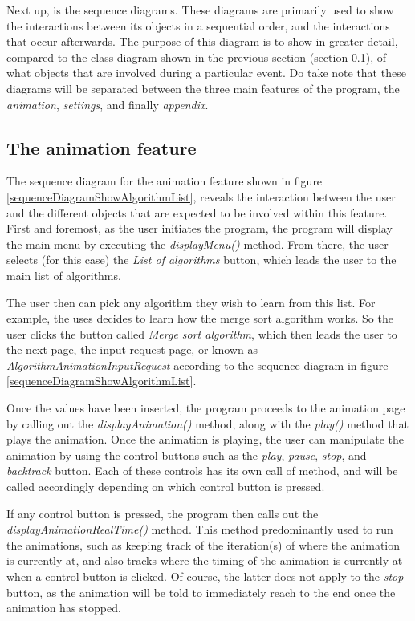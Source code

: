 Next up, is the sequence diagrams. These diagrams are primarily used to show the interactions between its objects in a sequential order, and the interactions that occur afterwards. The purpose of this diagram is to show in greater detail, compared to the class diagram shown in the previous section (section \ref{}), of what objects that are involved during a particular event. Do take note that these diagrams will be separated between the three main features of the program, the \textit{animation}, \textit{settings}, and finally \textit{appendix}.


\subsection{The animation feature}
The sequence diagram for the animation feature shown in figure \ref{sequenceDiagramShowAlgorithmList}, reveals the interaction between the user and the different objects that are expected to be involved within this feature. First and foremost, as the user initiates the program, the program will display the main menu by executing the \textit{displayMenu()} method. From there, the user selects (for this case) the \textit{List of algorithms} button, which leads the user to the main list of algorithms.

The user then can pick any algorithm they wish to learn from this list. For example, the uses decides to learn how the merge sort algorithm works. So the user clicks the button called \textit{Merge sort algorithm}, which then leads the user to the next page, the input request page, or known as \textit{AlgorithmAnimationInputRequest} according to the sequence diagram in figure \ref{sequenceDiagramShowAlgorithmList}.

Once the values have been inserted, the program proceeds to the animation page by calling out the \textit{displayAnimation()} method, along with the \textit{play()} method that plays the animation. Once the animation is playing, the user can manipulate the animation by using the control buttons such as the \textit{play}, \textit{pause}, \textit{stop}, and \textit{backtrack} button. Each of these controls has its own call of method, and will be called accordingly depending on which control button is pressed. 

If any control button is pressed, the program then calls out the \textit{displayAnimationRealTime()} method. This method predominantly used to run the animations, such as keeping track of the iteration(s) of where the animation is currently at, and also tracks where the timing of the animation is currently at when a control button is clicked. Of course, the latter does not apply to the \textit{stop} button, as the animation will be told to immediately reach to the end once the animation has stopped. 

